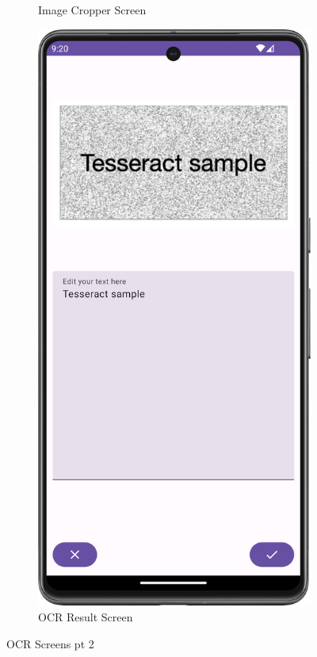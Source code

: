 \begin{figure}[H]
\begin{subfigure}[b]{0.3\textwidth}
    \caption{Image Cropper Screen}
    \label{fig:image_crop}
  \end{subfigure}
  \hfill
  \begin{subfigure}[b]{0.3\textwidth}
    \includegraphics[width=\textwidth]{Figures/Product_Images/OCR/image_result.png}
    \caption{OCR Result Screen}
    \label{fig:image_result}
  \end{subfigure}
  \caption{OCR Screens pt 2}
  \label{fig:OCR_screens_2}
\end{figure}



